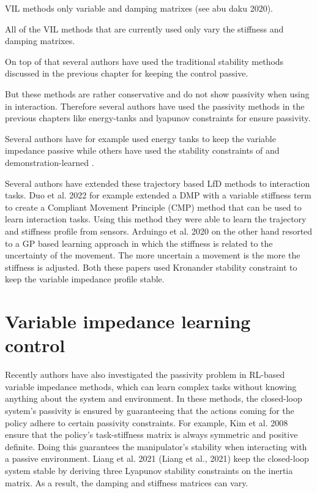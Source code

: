 VIL methods only variable and damping matrixes (see abu daku 2020).

All of the VIL methods that are currently used only vary the stiffness and damping matrixes.

On top of that several authors have used the traditional stability methods discussed in the previous chapter for keeping the control passive.

But these methods are rather conservative and do not show passivity when using in interaction. Therefore several authors have used the passivity methods in the previous chapters like energy-tanks and lyapunov constraints for ensure passivity.

Several authors have for example used energy tanks to keep the variable impedance passive \cite{amanhoudForceAdaptationContact2020,enayatiVariableImpedanceForceControl2020,kastritsiProgressiveAutomationDMP2018,michelBilateralTeleoperationAdaptive2021,saverianoEnergybasedApproachEnsure2020,shahriariAdaptingContactsEnergy2017,wuFrameworkAutonomousImpedance2021,amanhoudDynamicalSystemApproach2019,kronanderPassiveInteractionControl2016} while others have used the stability constraints of and demonstration-learned \cite{arduengoGaussianProcessbasedRobotLearning2020,douRobotSkillLearning2022}.

Several authors have extended these trajectory based LfD methods to interaction tasks. Duo et al. 2022 for example \cite{douRobotSkillLearning2022} extended a DMP with a variable stiffness term to create a Compliant Movement Principle (CMP) method that can be used to learn interaction tasks. Using this method they were able to learn the trajectory and stiffness profile from sensors. Arduingo et al. 2020 on the other hand resorted to a GP based learning approach in which the stiffness is related to the uncertainty of the movement. The more uncertain a movement is the more the stiffness is adjusted. Both these papers used Kronander stability constraint to keep the variable impedance profile stable.


\section{Variable impedance learning control}

Recently authors have also investigated the passivity problem in RL-based variable impedance methods, which can learn complex tasks without knowing anything about the system and environment. In these methods, the closed-loop system's passivity is ensured by guaranteeing that the actions coming for the policy adhere to certain passivity constraints. For example, Kim et al. 2008 \cite{kimLearningRobotStiffness2008} ensure that the policy's task-stiffness matrix is always symmetric and positive definite. Doing this guarantees the manipulator's stability when interacting with a passive environment. Liang et al. 2021 (Liang et al., 2021) keep the closed-loop system stable by deriving three Lyapunov stability constraints on the inertia matrix. As a result, the damping and stiffness matrices can vary.

